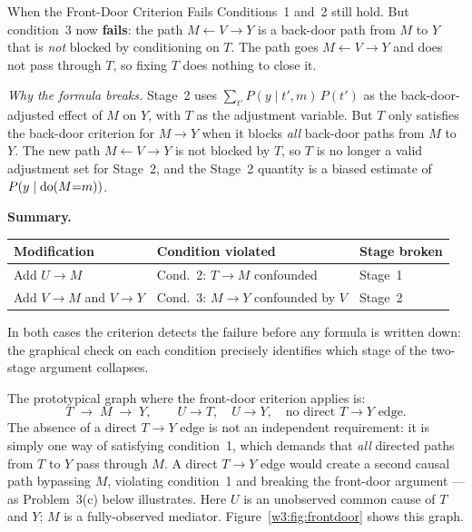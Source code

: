 \documentclass[master.tex]{subfiles}
\begin{document}
\begin{example}{When the Front-Door Criterion Fails}
\noindent
Conditions~1 and~2 still hold.  But condition~3 now \textbf{fails}: the
path $M \leftarrow V \to Y$ is a back-door path from $M$ to $Y$ that is
\emph{not} blocked by conditioning on $T$.  The path goes
$M \leftarrow V \to Y$ and does not pass through $T$, so fixing $T$ does
nothing to close it.

\textit{Why the formula breaks.}  Stage~2 uses $\sum_{t'} P(y \mid t', m)\,P(t')$
as the back-door-adjusted effect of $M$ on $Y$, with $T$ as the adjustment
variable.  But $T$ only satisfies the back-door criterion for $M \to Y$
when it blocks \emph{all} back-door paths from $M$ to $Y$.  The new path
$M \leftarrow V \to Y$ is not blocked by $T$, so $T$ is no longer a valid
adjustment set for Stage~2, and the Stage~2 quantity is a biased estimate
of $P(y \mid \mathrm{do}(M{=}m))$.

\medskip
\noindent\textbf{Summary.}
\begin{center}
\renewcommand{\arraystretch}{1.3}
\begin{tabular}{@{\hspace{6pt}}lll@{\hspace{6pt}}}
\toprule
\textbf{Modification} & \textbf{Condition violated} & \textbf{Stage broken} \\
\midrule
Add $U \to M$ & Cond.~2: $T \to M$ confounded & Stage~1 \\
Add $V \to M$ and $V \to Y$ & Cond.~3: $M \to Y$ confounded by $V$ & Stage~2 \\
\bottomrule
\end{tabular}
\end{center}
In both cases the criterion detects the failure before any formula is written down: the graphical check on each condition precisely identifies which stage of the two-stage argument collapses.
\end{example}

The prototypical graph where the front-door criterion applies is:
\[
  T \;\to\; M \;\to\; Y, \qquad U \to T, \quad U \to Y,
  \quad \text{no direct } T \to Y \text{ edge.}
\]
The absence of a direct $T \to Y$ edge is not an independent requirement:
it is simply one way of satisfying condition~1, which demands that
\emph{all} directed paths from $T$ to $Y$ pass through $M$.  A direct
$T \to Y$ edge would create a second causal path bypassing $M$, violating
condition~1 and breaking the front-door argument --- as Problem~3(c) below
illustrates.
Here $U$ is an unobserved common cause of $T$ and $Y$; $M$ is a
fully-observed mediator.  Figure~\ref{w3:fig:frontdoor} shows this graph.
\end{document}
